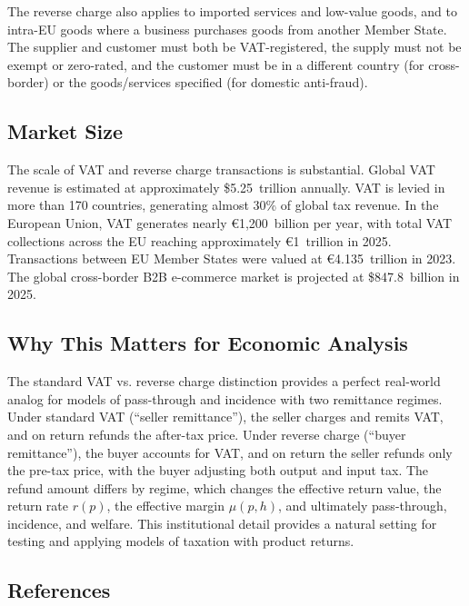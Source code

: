 \documentclass[11pt]{article}
\begin{document}
The reverse charge also applies to imported services and low-value goods, and to intra-EU goods where a business purchases goods from another Member State. The supplier and customer must both be VAT-registered, the supply must not be exempt or zero-rated, and the customer must be in a different country (for cross-border) or the goods/services specified (for domestic anti-fraud).

\subsection{Market Size}

The scale of VAT and reverse charge transactions is substantial. Global VAT revenue is estimated at approximately \$5.25~trillion annually. VAT is levied in more than 170 countries, generating almost 30\% of global tax revenue. In the European Union, VAT generates nearly €1,200~billion per year, with total VAT collections across the EU reaching approximately €1~trillion in 2025. Transactions between EU Member States were valued at €4.135~trillion in 2023. The global cross-border B2B e-commerce market is projected at \$847.8~billion in 2025.

\subsection{Why This Matters for Economic Analysis}

The standard VAT vs. reverse charge distinction provides a perfect real-world analog for models of pass-through and incidence with two remittance regimes. Under standard VAT (``seller remittance''), the seller charges and remits VAT, and on return refunds the after-tax price. Under reverse charge (``buyer remittance''), the buyer accounts for VAT, and on return the seller refunds only the pre-tax price, with the buyer adjusting both output and input tax. The refund amount differs by regime, which changes the effective return value, the return rate \( r(p) \), the effective margin \( \mu(p,h) \), and ultimately pass-through, incidence, and welfare. This institutional detail provides a natural setting for testing and applying models of taxation with product returns.

\subsection{References}
\end{document}
